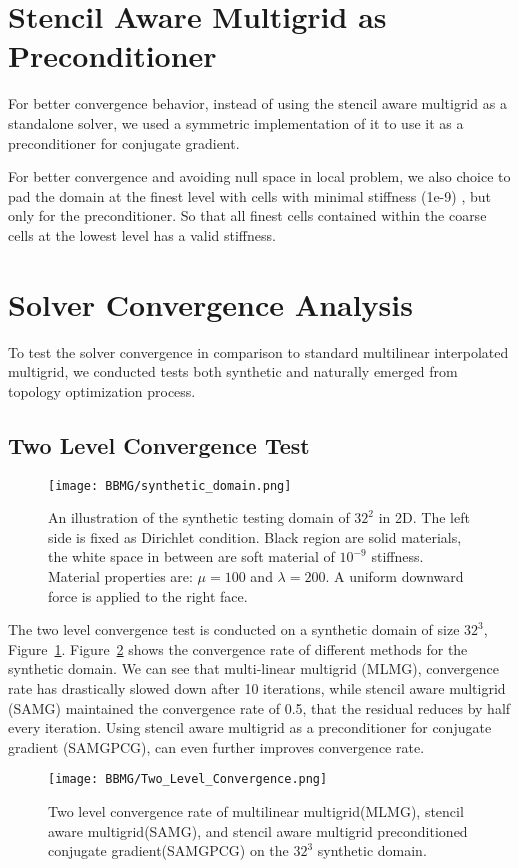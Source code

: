 \section{Stencil Aware Multigrid as Preconditioner}
For better convergence behavior, instead of using the stencil aware multigrid as a standalone solver, we used a symmetric implementation of it to use it as a preconditioner for conjugate gradient.

For better convergence and avoiding null space in local problem, we also choice to pad the domain at the finest level with cells with minimal stiffness (1e-9) , but only for the preconditioner. So that all finest cells contained within the coarse cells at the lowest level has a valid stiffness. 
 \section{Solver Convergence Analysis}
 To test the solver convergence in comparison to standard multilinear interpolated multigrid, we conducted tests both synthetic and naturally emerged from topology optimization process.
 \subsection{Two Level Convergence Test}
  \begin{figure}[t]
\texttt{[image: BBMG/synthetic\_domain.png]}
\centering
\caption{An illustration of the synthetic testing domain of $32^2$ in 2D. The left side is fixed as Dirichlet condition. Black region are solid materials, the white space in between are soft material of $10^{-9}$ stiffness. Material properties are: $\mu = 100$ and $\lambda = 200$. A uniform downward force is applied to the right face.}
\label{fig:synthetic_domain}
\end{figure}
 The two level convergence test is conducted on a synthetic domain of size $32^3$, Figure~\ref{fig:synthetic_domain}. Figure~\ref{fig:Two_Level_Convergence} shows the convergence rate of different methods for the synthetic domain. We can see that multi-linear multigrid (MLMG), convergence rate has drastically slowed down after 10 iterations, while stencil aware multigrid (SAMG) maintained the convergence rate of 0.5, that the residual reduces by half every iteration. Using stencil aware multigrid as a preconditioner for conjugate gradient (SAMGPCG), can even further improves convergence rate.
   \begin{figure}[t]
\texttt{[image: BBMG/Two\_Level\_Convergence.png]}
\centering
\caption{Two level convergence rate of multilinear multigrid(MLMG), stencil aware multigrid(SAMG), and stencil aware multigrid preconditioned conjugate gradient(SAMGPCG) on the $32^3$ synthetic domain.}
\label{fig:Two_Level_Convergence}
\end{figure}
